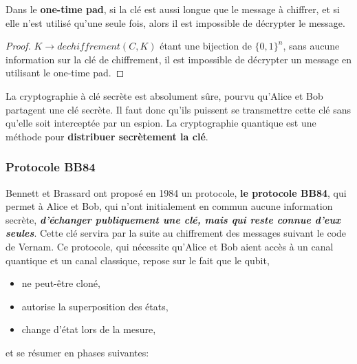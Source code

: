 \colorbox[gray]{0.8}{
  \parbox[c]{0.9\textwidth}{
    \begin{proposition}
Dans le \textbf{one-time pad}, si la clé est aussi longue que le message à
chiffrer, et si elle n'est utilisé qu'une seule fois, alors il est impossible de
décrypter le message.
    \end{proposition}
  }}

\begin{proof}
$K\rightarrow dechiffrement(C,K)$ étant une bijection de $\{0,1\}^{n}$, sans
aucune information sur la clé de chiffrement, il est impossible de décrypter un
message en utilisant le one-time pad.
\end{proof}

La cryptographie à clé secrète est absolument sûre, pourvu qu'Alice et Bob
partagent une clé secrète. Il faut donc qu'ils puissent se transmettre cette
clé sans qu'elle soit interceptée par un espion. La cryptographie quantique
est une méthode pour \textbf{distribuer secrètement la clé}.

\subsubsection{Protocole BB84}

Bennett et Brassard ont proposé en 1984 un protocole, \textbf{le protocole
BB84}, qui permet à Alice et Bob, qui n'ont initialement en commun aucune
information secrète, \textbf{\emph{d'échanger publiquement une clé, mais qui
reste connue d'eux seules}}. Cette clé servira par la suite au chiffrement des
messages suivant le code de Vernam. Ce protocole, qui nécessite qu'Alice et Bob
aient accès à un canal quantique et un canal classique, repose sur le fait que
le qubit,
\begin{itemize}
 \item ne peut-être cloné,
  \item autorise la superposition des états,
   \item change d'état lors de la mesure,
\end{itemize}
et se résumer en phases suivantes:


